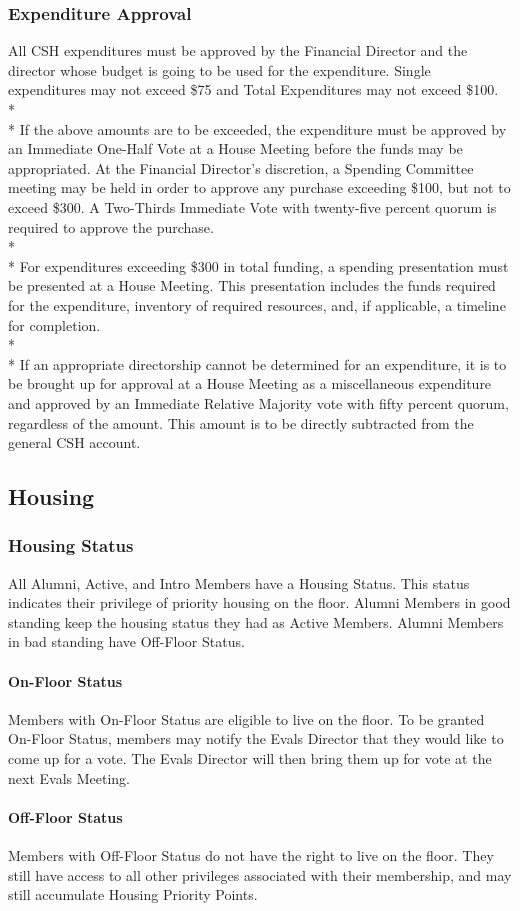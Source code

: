 \documentclass{article}
\newcommand{\asection}[1]{\subsection{#1} \label{#1}}
\newcommand{\asubsection}[1]{\subsubsection{#1} \label{#1}}
\newcommand{\asubsubsection}[1]{\paragraph{#1} \label{#1}}
\begin{document}
\asubsection{Expenditure Approval}
All CSH expenditures must be approved by the Financial Director and the director whose budget is going to be used for the expenditure.
Single expenditures may not exceed \$75 and Total Expenditures may not exceed \$100.
\\* \\*
If the above amounts are to be exceeded, the expenditure must be approved by an Immediate One-Half Vote at a House Meeting before the funds may be appropriated.
At the Financial Director's discretion, a Spending Committee meeting may be held in order to approve any purchase exceeding \$100, but not to exceed \$300.
A Two-Thirds Immediate Vote with twenty-five percent quorum is required to approve the purchase.
\\*\\*
For expenditures exceeding \$300 in total funding, a spending presentation must be presented at a House Meeting.
This presentation includes the funds required for the expenditure, inventory of required resources, and, if applicable, a timeline for completion.
\\* \\*
If an appropriate directorship cannot be determined for an expenditure, it is to be brought up for approval at a House Meeting as a miscellaneous expenditure and approved by an Immediate Relative Majority vote with fifty percent quorum, regardless of the amount.
This amount is to be directly subtracted from the general CSH account.
\asection{Housing}

\asubsection{Housing Status}
All Alumni, Active, and Intro Members have a Housing Status.
This status indicates their privilege of priority housing on the floor.
Alumni Members in good standing keep the housing status they had as Active Members.
Alumni Members in bad standing have Off-Floor Status.

\asubsubsection{On-Floor Status}
Members with On-Floor Status are eligible to live on the floor.
To be granted On-Floor Status, members may notify the Evals Director that they would like to come up for a vote.
The Evals Director will then bring them up for vote at the next Evals Meeting.

\asubsubsection{Off-Floor Status}
Members with Off-Floor Status do not have the right to live on the floor.
They still have access to all other privileges associated with their membership, and may still accumulate Housing Priority Points.
\end{document}
